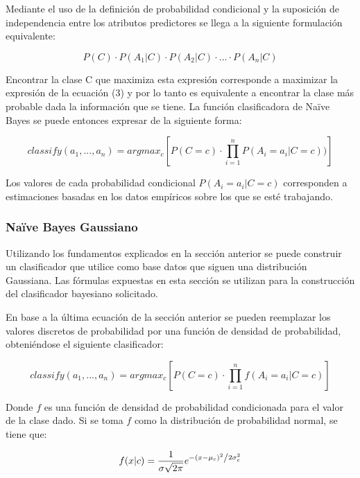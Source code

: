 \documentclass[letter, titlepage, 10pt]{article}
\begin{document}
Mediante el uso de la definición de probabilidad condicional y la suposición de independencia entre los atributos predictores se llega a la siguiente formulación equivalente:

\begin{equation}
P(C)\cdot P(A_1|C)\cdot P(A_2|C) \cdot...\cdot P(A_n|C)
\end{equation}

Encontrar la clase C que maximiza esta expresión corresponde a maximizar la expresión de la ecuación (3) y por lo tanto es equivalente a encontrar la clase más probable dada la información que se tiene.
La función clasificadora de Naïve Bayes se puede entonces expresar de la siguiente forma:

\begin{equation}
classify(a_1,...,a_n) = argmax_{c}\left[P(C = c)\cdot \prod\limits_{i=1}^n P(A_i = a_i|C = c))\right]
\end{equation}


Los valores de cada probabilidad condicional $P(A_i = a_i|C = c)$ corresponden a estimaciones basadas en los datos empíricos sobre los que se esté trabajando.

	\subsubsection{Naïve Bayes Gaussiano}
Utilizando los fundamentos explicados en la sección anterior se puede construir un clasificador que utilice como base datos que siguen una distribución Gaussiana. Las fórmulas expuestas en esta sección se utilizan para la construcción del clasificador bayesiano solicitado.

En base a la última ecuación de la sección anterior se pueden reemplazar los valores discretos de probabilidad por una función de densidad de probabilidad, obteniéndose el siguiente clasificador:

\begin{equation}
classify(a_1,...,a_n) = argmax_{c}\left[P(C = c)\cdot \prod\limits_{i=1}^n f(A_i = a_i|C = c)\right]
\end{equation}

Donde $f$ es una función de densidad de probabilidad condicionada para el valor de la clase dado. Si se toma $f$ como la distribución de probabilidad normal, se tiene que:

\begin{equation}
f(x|c) = \frac{1}{{\sigma \sqrt {2\pi } }}e^{{{ - \left( {x - \mu_c } \right)^2 } \mathord{\left/ {\vphantom {{ - \left( {x - \mu_c } \right)^2 } {2\sigma_c ^2 }}} \right. \kern-\nulldelimiterspace} {2\sigma_c ^2 }}}
\end{equation}
\end{document}
